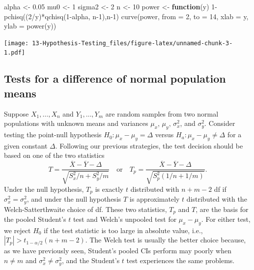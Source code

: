 \documentclass[
]{book}
\newenvironment{Shaded}{\begin{snugshade}}{\end{snugshade}}
\newcommand{\AttributeTok}[1]{\textcolor[rgb]{0.77,0.63,0.00}{#1}}
\newcommand{\ControlFlowTok}[1]{\textcolor[rgb]{0.13,0.29,0.53}{\textbf{#1}}}
\newcommand{\DecValTok}[1]{\textcolor[rgb]{0.00,0.00,0.81}{#1}}
\newcommand{\FloatTok}[1]{\textcolor[rgb]{0.00,0.00,0.81}{#1}}
\newcommand{\FunctionTok}[1]{\textcolor[rgb]{0.00,0.00,0.00}{#1}}
\newcommand{\NormalTok}[1]{#1}
\newcommand{\OtherTok}[1]{\textcolor[rgb]{0.56,0.35,0.01}{#1}}
\newcommand{\SpecialCharTok}[1]{\textcolor[rgb]{0.00,0.00,0.00}{#1}}
\newcommand{\StringTok}[1]{\textcolor[rgb]{0.31,0.60,0.02}{#1}}
\begin{document}
\begin{Shaded}
\begin{Highlighting}[]
\NormalTok{alpha }\OtherTok{\textless{}{-}} \FloatTok{0.05}
\NormalTok{mu0 }\OtherTok{\textless{}{-}} \DecValTok{1}
\NormalTok{sigma2 }\OtherTok{\textless{}{-}} \DecValTok{2}
\NormalTok{n }\OtherTok{\textless{}{-}} \DecValTok{10}
\NormalTok{power }\OtherTok{\textless{}{-}} \ControlFlowTok{function}\NormalTok{(y)  }\DecValTok{1}\SpecialCharTok{{-}}\FunctionTok{pchisq}\NormalTok{((}\DecValTok{2}\SpecialCharTok{/}\NormalTok{y)}\SpecialCharTok{*}\FunctionTok{qchisq}\NormalTok{(}\DecValTok{1}\SpecialCharTok{{-}}\NormalTok{alpha, n}\DecValTok{{-}1}\NormalTok{),n}\DecValTok{{-}1}\NormalTok{)}
\FunctionTok{curve}\NormalTok{(power, }\AttributeTok{from =} \DecValTok{2}\NormalTok{, }\AttributeTok{to =} \DecValTok{14}\NormalTok{, }\AttributeTok{xlab =} \StringTok{\textquotesingle{}y\textquotesingle{}}\NormalTok{, }\AttributeTok{ylab =} \StringTok{\textquotesingle{}power(y)\textquotesingle{}}\NormalTok{)  }
\end{Highlighting}
\end{Shaded}

\texttt{[image: 13-Hypothesis-Testing\_files/figure-latex/unnamed-chunk-3-1.pdf]}

\hypertarget{tests-for-a-difference-of-normal-population-means}{%
\subsection{Tests for a difference of normal population means}\label{tests-for-a-difference-of-normal-population-means}}

Suppose \(X_1, \ldots, X_n\) and \(Y_1, \ldots, Y_m\) are random samples from two normal populations with unknown means and variances \(\mu_x\), \(\mu_y\), \(\sigma_x^2\), and \(\sigma_y^2\). Consider testing the point-null hypothesis \(H_0:\mu_x - \mu_y = \Delta\) versus \(H_a:\mu_x - \mu_y \ne \Delta\) for a given constant \(\Delta\). Following our previous strategies, the test decision should be based on one of the two statistics
\[T = \frac{\overline X - \overline Y - \Delta}{\sqrt{S_x^2/n + S_y^2/m}} \quad \text{or}\quad T_p = \frac{\overline X - \overline Y - \Delta}{\sqrt{S_p^2\left(1/n+1/m\right)}}.\]
Under the null hypothesis, \(T_p\) is exactly \(t\) distributed with \(n+m-2\) df if \(\sigma_x^2 = \sigma_y^2\), and under the null hypothesis \(T\) is approximately \(t\) distributed with the Welch-Satterthwaite choice of df. These two statistics, \(T_p\) and \(T\), are the basis for the pooled Student's \(t\) test and Welch's unpooled test for \(\mu_x - \mu_y\). For either test, we reject \(H_0\) if the test statistic is too large in absolute value, i.e., \(|T_p|>t_{1-\alpha/2}(n+m-2)\). The Welch test is usually the better choice because, as we have previously seen, Student's pooled CIs perform may poorly when \(n\ne m\) and \(\sigma_x^2 \ne \sigma_y^2\), and the Student's \(t\) test experiences the same problems.
\end{document}
